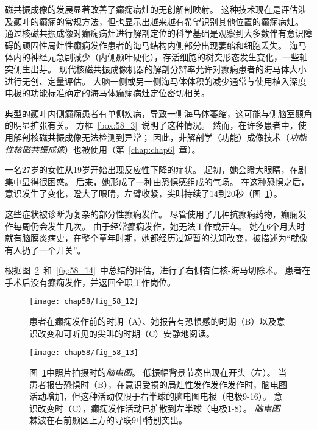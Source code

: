 磁共振成像的发展显著改善了癫痫病灶的无创解剖映射。
这种技术现在是评估涉及颞叶的癫痫的常规方法，但也显示出越来越有希望识别其他位置的癫痫病灶。
通过核磁共振成像对癫痫病灶进行解剖定位的科学基础是观察到大多数伴有意识障碍的顽固性局灶性癫痫发作患者的海马结构内侧部分出现萎缩和细胞丢失。
海马体内的神经元急剧减少（内侧颞叶硬化），存活细胞的树突形态发生变化，一些轴突侧生出芽。
现代核磁共振成像机器的解剖分辨率允许对癫痫患者的海马体大小进行无创、定量评估。
大脑一侧或另一侧海马体体积的减少通常与使用植入深度电极的功能标准确定的海马体癫痫病灶定位密切相关。


典型的颞叶内侧癫痫患者有单侧疾病，导致一侧海马体萎缩，这可能与侧脑室颞角的明显扩张有关。
方框~\ref{box:58_3}~说明了这种情况。
然而，在许多患者中，使用解剖核磁共振成像无法检测到异常；
因此，非解剖学（功能）成像技术（\textit{功能性核磁共振成像}）也被使用（第~\ref{chap:chap6}~章）。


\begin{proposition}[神经解剖学导航术语] \label{box:58_3}
	
	\quad \quad 一名27岁的女性从19岁开始出现反应性下降的症状。
	起初，她会瞪大眼睛，在剧集中显得很困惑。
	后来，她形成了一种由恐惧感组成的气场。
	在这种恐惧之后，意识发生了变化，瞪大了眼睛，左臂收紧，尖叫持续了14到20秒（图~\ref{fig:58_12}）。
	
	\quad \quad 这些症状被诊断为复杂的部分性癫痫发作。
	尽管使用了几种抗癫痫药物，癫痫发作每周仍会发生几次。
	由于经常癫痫发作，她无法工作或开车。
	她在6个月大时就有脑膜炎病史，在整个童年时期，她都经历过短暂的认知改变，被描述为“就像有人扔了一个开关”。
	
	\quad \quad 根据图~\ref{fig:58_13}~和~\ref{fig:58_14}~中总结的评估，进行了右侧杏仁核-海马切除术。
	患者在手术后没有癫痫发作，并返回全职工作岗位。
	
\end{proposition}


\begin{figure}[htbp]
	\centering
	\texttt{[image: chap58/fig\_58\_12]}
	\caption{患者在癫痫发作前的时期（A）、她报告有恐惧感的时期（B）以及意识改变和可听见的尖叫的时期（C）安静地阅读。}
	\label{fig:58_12}
\end{figure}


\begin{figure}[htbp]
	\centering
	\texttt{[image: chap58/fig\_58\_13]}
	\caption{图~\ref{fig:58_12}中照片拍摄时的\textit{脑电图}。
		低振幅背景节奏出现在开头（左）。
		当患者报告恐惧时（B），在意识受损的局灶性发作发作发作时，脑电图活动增加，但这种活动仅限于右半球的脑电图电极（电极9-16）。
		意识改变时（C），癫痫发作活动已扩散到左半球（电极1-8）。
		\textit{脑电图}棘波在右前颞区上方的导联9中特别突出。}
	\label{fig:58_13}
\end{figure}



